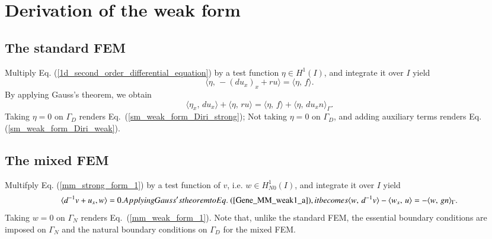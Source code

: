 \documentclass[review,3p]{elsarticle}
\begin{document}
\appendix

\section{Derivation of the weak form}		\label{weak form appendix}

\subsection{The standard FEM}		\label{derivation_weak_form_SM}

Multiply Eq. (\ref{1d_second_order_differential_equation}) by a test function $\eta \in H ^1 (I)$, and integrate it over $I$ yield
\begin{equation}
\langle \eta, \, -\left( d u_x \right)_x + ru \rangle = \langle \eta, \, f \rangle. \label{inte}
\end{equation}
By applying Gauss's theorem, we obtain
\begin{equation}
 \langle {\eta} _x, \, d u_x \rangle + \langle \eta, \, ru \rangle = \langle \eta, \, f \rangle + \langle \eta, \, d u_x n \rangle_{ {\Gamma}}.		\label{gauss}
\end{equation}
Taking $\eta=0$ on $\Gamma_{D}$ renders Eq.~({\ref{sm_weak_form_Diri_strong}}); Not taking $\eta=0$ on $\Gamma_{D}$, and adding auxiliary terms renders Eq. (\ref{sm_weak_form_Diri_weak}).

\subsection{The mixed FEM}		\label{derivation_weak_form_MM}
Multifply Eq. (\ref{mm_strong_form_1}) by a test function of $v$, i.e. $w \in H _{N0}^{1}(I)$, and integrate it over $I$ yield
\begin{subequations}
\begin{align}
  \langle d^{-1}v + u _x, w \rangle = 0.	\label{Gene_MM_weak1_a}
\end{align}
Applying Gauss's theorem to Eq.~(\ref{Gene_MM_weak1_a}), it becomes
\begin{align}
 \langle w, \, d^{-1}v \rangle - \langle w_x, \,  u \rangle = -\langle w, \, g n\rangle_{\Gamma}.		\label{Gene_MM_weak1_b}
\end{align}				\label{Gene_MM_weak1}%
\end{subequations}
Taking $w=0$ on $\Gamma_{N}$ renders Eq.~({\ref{mm_weak_form_1}}). Note that, unlike the standard FEM, the essential boundary conditions are imposed on $\Gamma _N$ and the natural boundary conditions on $\Gamma _D$ for the mixed FEM.
\end{document}
